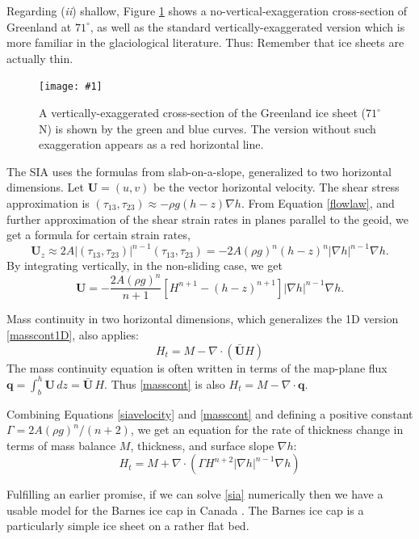 \documentclass[titlepage,a4paper,final,12pt]{scrartcl}
\newcommand{\bq}{\mathbf{q}}
\newcommand{\grad}{\nabla}
\newcommand{\Div}{\nabla\cdot}
\newcommand{\onefigsize}[3]{
\begin{figure}[ht]
\centering
\texttt{[image: \#1]}
\caption{#2}
\label{fig:#1}
\end{figure}}
\newcommand{\onefig}[2]{\onefigsize{#1}{#2}{3.0in}}
\begin{document}
Regarding (\emph{ii}) shallow, Figure \ref{fig:green_transect} shows a no-vertical-exaggeration cross-section of Greenland at $71^\circ$, as well as the standard vertically-exaggerated version which is more familiar in the glaciological literature.  Thus: Remember that ice sheets are actually thin.

\onefig{green_transect}{A vertically-exaggerated cross-section of the Greenland ice sheet ($71^\circ$ N) is shown by the green and blue curves.  The version without such exaggeration appears as a red horizontal line.}

The SIA uses the formulas from slab-on-a-slope, generalized to two horizontal dimensions.  Let $\mathbf{U} = (u,v)$ be the vector horizontal velocity.  The shear stress approximation is $(\tau_{13},\tau_{23}) \approx - \rho g (h-z) \nabla h$.  From Equation \eqref{flowlaw}, and further approximation of the shear strain rates in planes parallel to the geoid, we get a formula for certain strain rates,
\begin{equation*}
\mathbf{U}_z \approx 2 A |(\tau_{13},\tau_{23})|^{n-1} (\tau_{13},\tau_{23}) = - 2 A (\rho g)^n (h-z)^n |\nabla h|^{n-1} \nabla h.
\end{equation*}
By integrating vertically, in the non-sliding case, we get
\begin{equation}
\mathbf{U} = - \frac{2 A (\rho g)^n}{n+1} \left[H^{n+1} - (h-z)^{n+1}\right] |\nabla h|^{n-1} \nabla h.  \label{siavelocity}
\end{equation}

Mass continuity in two horizontal dimensions, which generalizes the 1D version \eqref{masscont1D}, also applies:
\begin{equation}
    H_t = M - \Div\left(\bar{\mathbf{U}} H\right)  \label{masscont}
\end{equation}
The mass continuity equation is often written in terms of the map-plane flux $\bq = \int_{b}^{h} \mathbf{U}\,dz = \bar{\mathbf{U}}\,H$.  Thus \eqref{masscont} is also $H_t = M - \Div \bq$.

Combining Equations \eqref{siavelocity} and \eqref{masscont} and defining a positive constant $\Gamma = 2 A (\rho g)^n / (n+2)$, we get an equation for the rate of thickness change in terms of mass balance $M$, thickness, and surface slope $\grad h$:
\begin{equation}
H_t = M + \Div \left(\Gamma H^{n+2} |\grad h|^{n-1} \grad h \right) \label{sia}
\end{equation}

Fulfilling an earlier promise, if we can solve \eqref{sia} numerically then we have a usable model for the Barnes ice cap in Canada \cite{Mahaffy}.  The Barnes ice cap is a particularly simple ice sheet on a rather flat bed.
\end{document}
